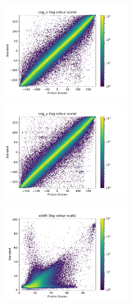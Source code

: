 \begin{frame}[t]
    \begin{figure}
        \centering
        \includegraphics[width=0.6\textwidth]{fig/cog_x_compare.pdf}
    \end{figure}
\end{frame}

\begin{frame}[t]
    \begin{figure}
        \centering
        \includegraphics[width=0.6\textwidth]{fig/cog_y_compare.pdf}
    \end{figure}
\end{frame}

\begin{frame}[t]
    \begin{figure}
        \centering
        \includegraphics[width=0.6\textwidth]{fig/width_compare.pdf}
    \end{figure}
\end{frame}

